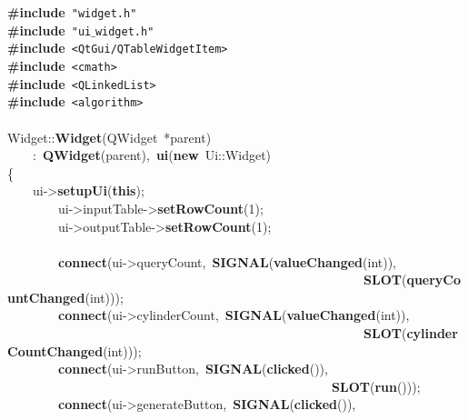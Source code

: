 \noindent
\mbox{}\textbf{\#include}\ \texttt{"{}widget.h"{}} \\
\mbox{}\textbf{\#include}\ \texttt{"{}ui$\_$widget.h"{}} \\
\mbox{}\textbf{\#include}\ \texttt{\textless{}QtGui/QTableWidgetItem\textgreater{}} \\
\mbox{}\textbf{\#include}\ \texttt{\textless{}cmath\textgreater{}} \\
\mbox{}\textbf{\#include}\ \texttt{\textless{}QLinkedList\textgreater{}} \\
\mbox{}\textbf{\#include}\ \texttt{\textless{}algorithm\textgreater{}} \\
\mbox{} \\
\mbox{}Widget::\textbf{Widget}(QWidget\ *parent) \\
\mbox{}\ \ \ \ :\ \textbf{QWidget}(parent),\ \textbf{ui}(\textbf{new}\ Ui::Widget) \\
\mbox{}\{ \\
\mbox{}\ \ \ \ ui-\textgreater{}\textbf{setupUi}(\textbf{this}); \\
\mbox{}\ \ \ \ \ \ \ \ ui-\textgreater{}inputTable-\textgreater{}\textbf{setRowCount}(1); \\
\mbox{}\ \ \ \ \ \ \ \ ui-\textgreater{}outputTable-\textgreater{}\textbf{setRowCount}(1); \\
\mbox{} \\
\mbox{}\ \ \ \ \ \ \ \ \textbf{connect}(ui-\textgreater{}queryCount,\ \textbf{SIGNAL}(\textbf{valueChanged}(int)), \\
\mbox{}\ \ \ \ \ \ \ \ \ \ \ \ \ \ \ \ \ \ \ \ \ \ \ \ \ \ \ \ \ \ \ \ \ \ \ \ \ \ \ \ \ \ \ \ \ \ \ \ \ \ \ \ \ \ \ \ \textbf{SLOT}(\textbf{queryCountChanged}(int))); \\
\mbox{}\ \ \ \ \ \ \ \ \textbf{connect}(ui-\textgreater{}cylinderCount,\ \textbf{SIGNAL}(\textbf{valueChanged}(int)), \\
\mbox{}\ \ \ \ \ \ \ \ \ \ \ \ \ \ \ \ \ \ \ \ \ \ \ \ \ \ \ \ \ \ \ \ \ \ \ \ \ \ \ \ \ \ \ \ \ \ \ \ \ \ \ \ \ \ \ \ \textbf{SLOT}(\textbf{cylinderCountChanged}(int))); \\
\mbox{}\ \ \ \ \ \ \ \ \textbf{connect}(ui-\textgreater{}runButton,\ \textbf{SIGNAL}(\textbf{clicked}()), \\
\mbox{}\ \ \ \ \ \ \ \ \ \ \ \ \ \ \ \ \ \ \ \ \ \ \ \ \ \ \ \ \ \ \ \ \ \ \ \ \ \ \ \ \ \ \ \ \ \ \ \ \ \ \ \textbf{SLOT}(\textbf{run}())); \\
\mbox{}\ \ \ \ \ \ \ \ \textbf{connect}(ui-\textgreater{}generateButton,\ \textbf{SIGNAL}(\textbf{clicked}()), \\
